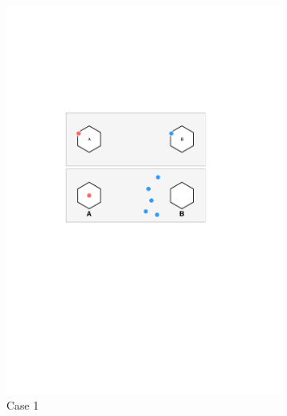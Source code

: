 \documentclass[conference]{IEEEtran}
\begin{document}
\begin{figure}[htbp]
	\centering
	\begin{subfigure}[b]{.24\textwidth}
		\includegraphics[width=\linewidth]{Section3/case1}
		\caption{Case 1}
	\end{subfigure}
	\begin{subfigure}[b]{.24\textwidth}

\end{subfigure}
\end{figure}
\end{document}
